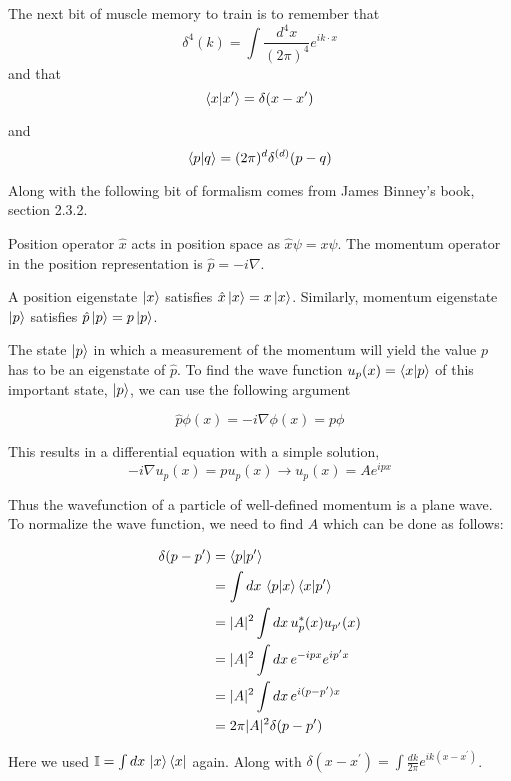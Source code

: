 The next bit of muscle memory to train is to remember that
$$
\delta^{4} (k) = \int \frac{d^4x}{(2\pi)^4} e^{ik\cdot x}
$$
and that
$$
\braket{x | x^\prime} = \delta(x - x^\prime)
$$

and
$$
\braket{p | q} = (2\pi)^d \delta^{(d)}(p - q)
$$

Along with the following bit of formalism comes from James Binney's book, section 2.3.2.

Position operator $\hat{x}$ acts in position space as $\hat{x} \psi = x\psi$.
The momentum operator in the position representation is $\hat{p} = -i\nabla$.

A position eigenstate $\ket{x}$ satisfies $\hat{x}\ket{x} = x\ket{x}$.
Similarly, momentum eigenstate $\ket{p}$ satisfies $\hat{p}\ket{p} = p\ket{p}$.

The state $\ket{p}$ in which a measurement of the momentum will yield the value $p$ has to be an eigenstate
of $\hat{p}$.
To find the wave function $u_p (x) = \braket{x | p}$ of this important state, $\ket{p}$,
we can use the following argument

$$
\hat{p} \phi(x) = -i\nabla \phi(x) = p\phi
$$

This results in a differential equation with a simple solution,
$$
-i\nabla u_p(x) = p u_p(x) \rightarrow u_p(x) = Ae^{ipx}
$$

Thus the wavefunction of a particle of well-defined momentum is a plane wave.
To normalize the wave function, we need to find $A$ which can be done as follows:

\begin{align*}
\delta(p - p^\prime) &= \braket{p | p^\prime} \\
&= \int dx \, \braket{p | x} \braket{x | p^\prime} \\
&= |A|^2 \int dx \, u_{p}^{*} (x) u_{p^\prime} (x) \\
&= |A|^2 \int dx \, e^{-ipx} e^{ip^\prime x} \\
&= |A|^2 \int dx \, e^{i(p - p^\prime) x} \\
&= 2\pi |A|^2 \delta(p - p^\prime)
\end{align*}

Here we used $\mathbb{I} = \int dx \, \ket{x}\bra{x}$ again.
Along with $\delta(x-x^\prime) = \int \frac{dk}{2\pi} e^{ik(x-x^\prime)}$.







